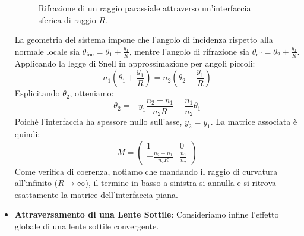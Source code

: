 \documentclass[openany,a4paper,12pt]{book}
\begin{document}
\begin{itemize}
\begin{figure}[H]
\begin{tikzpicture}[scale=1.1, transform shape, >=stealth]
\end{tikzpicture}
\caption{Rifrazione di un raggio parassiale attraverso un'interfaccia sferica di raggio $R$.}
\label{fig:interfaccia_sferica}
\end{figure}
La geometria del sistema impone che l'angolo di incidenza rispetto alla normale locale sia $\theta_{\text{inc}} = \theta_1 + \frac{y_1}{R}$, mentre l'angolo di rifrazione sia $\theta_{\text{rif}} = \theta_2 + \frac{y_1}{R}$. 
Applicando la legge di Snell in approssimazione per angoli piccoli:
\begin{equation}
    n_1 \left( \theta_1 + \frac{y_1}{R} \right) = n_2 \left( \theta_2 + \frac{y_1}{R} \right)
\end{equation}
Esplicitando $\theta_2$, otteniamo:
\begin{equation}
    \theta_2 = - y_1 \frac{n_2 - n_1}{n_2 R} + \frac{n_1}{n_2} \theta_1
\end{equation}
Poiché l'interfaccia ha spessore nullo sull'asse, $y_2 = y_1$. La matrice associata è quindi: 
\begin{equation}
    M = 
    \begin{pmatrix}
        1 & 0 \\ 
       -\frac{n_2 - n_1}{n_2 R} & \frac{n_1}{n_2} 
    \end{pmatrix}
\end{equation}
Come verifica di coerenza, notiamo che mandando il raggio di curvatura all'infinito ($R \to \infty$), il termine in basso a sinistra si annulla e si ritrova esattamente la matrice dell'interfaccia piana.

\item \textbf{Attraversamento di una Lente Sottile}: Consideriamo infine l'effetto globale di una lente sottile convergente.

\begin{figure}[H]
\centering
{}
\end{figure}
\end{itemize}
\end{document}
